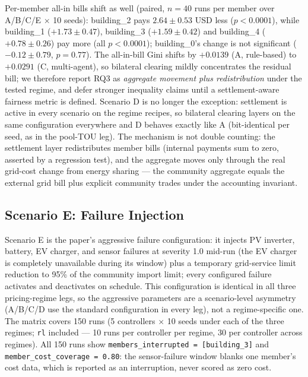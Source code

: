 \documentclass[11pt,a4paper]{article}
\newcommand{\agent}[1]{\texttt{#1}}
\begin{document}
Per-member all-in bills shift as well (paired, $n{=}40$ runs per member over
A/B/C/E $\times$ 10 seeds): building\_2 pays $2.64 \pm 0.53$ USD less
($p < 0.0001$), while building\_1 ($+1.73 \pm 0.47$), building\_3
($+1.59 \pm 0.42$) and building\_4 ($+0.78 \pm 0.26$) pay more (all
$p < 0.0001$); building\_0's change is not significant ($-0.12 \pm 0.79$,
$p{=}0.77$). The all-in-bill Gini shifts by $+0.0139$ (A, rule-based) to
$+0.0291$ (C, multi-agent), so bilateral clearing mildly concentrates the
residual bill; we therefore report RQ3 as \emph{aggregate movement plus
redistribution} under the tested regime, and defer stronger inequality claims
until a settlement-aware fairness metric is defined. Scenario D is no longer
the exception: settlement is active in every scenario on the regime recipes,
so bilateral clearing layers on the same configuration everywhere and D
behaves exactly like A (bit-identical per seed, as in the pool-TOU leg). The
mechanism is not double counting: the settlement layer redistributes member
bills (internal payments sum to zero, asserted by a regression test), and the
aggregate moves only through the real grid-cost change from energy sharing
--- the community aggregate equals the external grid bill plus explicit
community trades under the accounting invariant.

\subsection{Scenario E: Failure Injection}
\label{sec:scenarioe}

Scenario E is the paper's aggressive failure configuration: it injects PV
inverter, battery, EV charger, and sensor failures at severity 1.0 mid-run (the
EV charger is completely unavailable during its window) plus a temporary
grid-service limit reduction to 95\% of the community import limit; every
configured failure activates and deactivates on schedule. This configuration is
identical in all three pricing-regime legs, so the aggressive parameters are a
scenario-level asymmetry (A/B/C/D use the standard configuration in every leg),
not a regime-specific one. The matrix covers 150 runs (5 controllers $\times$ 10
seeds under each of the three regimes; \agent{rl} included --- 10 runs per
controller per regime, 30 per controller across regimes). All 150 runs show
\texttt{members\_interrupted = [building\_3]} and \texttt{member\_cost\_coverage
= 0.80}: the sensor-failure window blanks one member's cost data, which is
reported as an interruption, never scored as zero cost.
\end{document}
